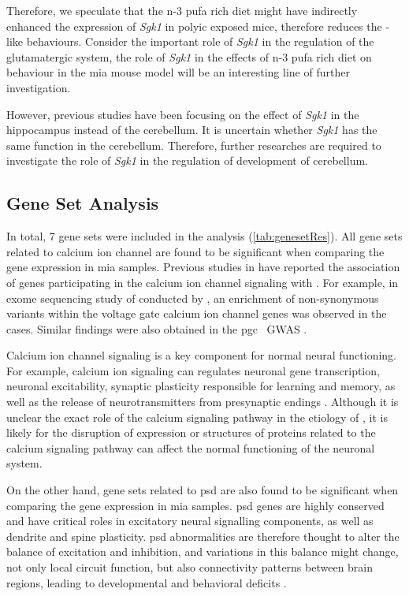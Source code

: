 Therefore, we speculate that the n-3 \gls{pufa} rich diet might have indirectly enhanced the expression of \textit{Sgk1} in \gls{polyic} exposed mice, therefore reduces the -like behaviours.
Consider the important role of \textit{Sgk1} in the regulation of the glutamatergic system, the role of \textit{Sgk1} in the effects of n-3 \gls{pufa} rich diet on behaviour in the \gls{mia} mouse model will be an interesting line of further investigation.

However, previous studies have been focusing on the effect of \textit{Sgk1} in the hippocampus instead of the cerebellum. 
It is uncertain whether \textit{Sgk1} has the same function in the cerebellum.
Therefore, further researches are required to investigate the role of \textit{Sgk1} in the regulation of development of cerebellum.




\subsection{Gene Set Analysis}
In total, 7 gene sets were included in the analysis (\cref{tab:genesetRes}). 
All gene sets related to calcium ion channel are found to be significant when comparing the gene expression in \gls{mia} samples. 
Previous studies in  have reported the association of genes participating in the calcium ion channel signaling with  \citep{Lidow2003,Purcell2014,Ripke2014}.
For example, in exome sequencing study of  conducted by \citet{Purcell2014}, an enrichment of non-synonymous variants within the voltage gate calcium ion channel genes was observed in the  cases.
Similar findings were also obtained in the \gls{pgc} \scz\ \gls{GWAS} \citep{Ripke2014}.

Calcium ion channel signaling is a key component for normal neural functioning.
For example, calcium ion signaling can regulates neuronal gene transcription, neuronal excitability, synaptic plasticity responsible for learning and memory, as well as the release of neurotransmitters from presynaptic endings \citep{Berridge2014}.
Although it is unclear the exact role of the calcium signaling pathway in the etiology of , it is likely for the disruption of expression or structures of proteins related to the calcium signaling pathway can affect the normal functioning of the neuronal system.

On the other hand, gene sets related to \gls{psd} are also found to be significant when comparing the gene expression in \gls{mia} samples. 
\gls{psd} genes are highly conserved and have critical roles in excitatory neural signalling components, as well as dendrite and spine plasticity.
\gls{psd} abnormalities are therefore thought to alter the balance of excitation and inhibition, and variations in this balance might change, not only local circuit function, but also connectivity patterns between brain regions, leading to developmental and behavioral deficits \citep{Cline2005}.

